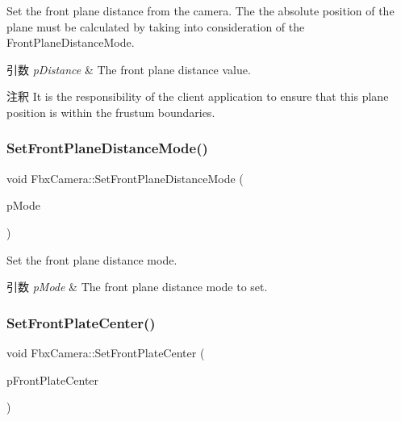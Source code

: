 Set the front plane distance from the camera. The the absolute position of the plane must be calculated by taking into consideration of the Front\+Plane\+Distance\+Mode. 
\begin{DoxyParams}{引数}
{\em p\+Distance} & The front plane distance value. \\
\hline
\end{DoxyParams}
\begin{DoxyRemark}{注釈}
It is the responsibility of the client application to ensure that this plane position is within the frustum boundaries. 
\end{DoxyRemark}
\mbox{\label{class_fbx_camera_ab0ea0c88ba780d06d5b6ac9c6f128c23}} 
\subsubsection{\texorpdfstring{Set\+Front\+Plane\+Distance\+Mode()}{SetFrontPlaneDistanceMode()}}
{\footnotesize\ttfamily void Fbx\+Camera\+::\+Set\+Front\+Plane\+Distance\+Mode (\begin{DoxyParamCaption}\item[{\hyperlink{class_fbx_camera_a79e74898d117e741c3fbd10b1ef21c79}{E\+Front\+Back\+Plane\+Distance\+Mode}}]{p\+Mode }\end{DoxyParamCaption})}

Set the front plane distance mode. 
\begin{DoxyParams}{引数}
{\em p\+Mode} & The front plane distance mode to set. \\
\hline
\end{DoxyParams}
\mbox{\label{class_fbx_camera_a7401f702c8c08483a70c5080ff04f59a}} 
\subsubsection{\texorpdfstring{Set\+Front\+Plate\+Center()}{SetFrontPlateCenter()}}
{\footnotesize\ttfamily void Fbx\+Camera\+::\+Set\+Front\+Plate\+Center (\begin{DoxyParamCaption}\item[{bool}]{p\+Front\+Plate\+Center }\end{DoxyParamCaption})}

